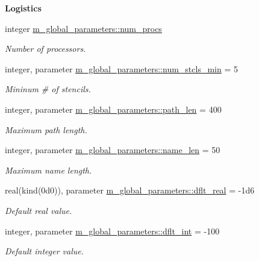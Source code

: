 \begin{Indent}\textbf{ Logistics}\par
\begin{DoxyCompactItemize}
\item 
integer \hyperlink{namespacem__global__parameters_aafb65952c33f1c363d1040bde29734ea}{m\+\_\+global\+\_\+parameters\+::num\+\_\+procs}
\begin{DoxyCompactList}\small\item\em Number of processors. \end{DoxyCompactList}\item 
integer, parameter \hyperlink{namespacem__global__parameters_a71f091e6074e6c248fd7e03218b89218}{m\+\_\+global\+\_\+parameters\+::num\+\_\+stcls\+\_\+min} = 5
\begin{DoxyCompactList}\small\item\em Mininum \# of stencils. \end{DoxyCompactList}\item 
integer, parameter \hyperlink{namespacem__global__parameters_aa9d578c318044b2f2ec990b5fc0dfab9}{m\+\_\+global\+\_\+parameters\+::path\+\_\+len} = 400
\begin{DoxyCompactList}\small\item\em Maximum path length. \end{DoxyCompactList}\item 
integer, parameter \hyperlink{namespacem__global__parameters_ac8252b115e717c6f1c8595be6f897df7}{m\+\_\+global\+\_\+parameters\+::name\+\_\+len} = 50
\begin{DoxyCompactList}\small\item\em Maximum name length. \end{DoxyCompactList}\item 
real(kind(0d0)), parameter \hyperlink{namespacem__global__parameters_a99ba7e33a1870ac89386d376e0d20526}{m\+\_\+global\+\_\+parameters\+::dflt\+\_\+real} = -\/1d6
\begin{DoxyCompactList}\small\item\em Default real value. \end{DoxyCompactList}\item 
integer, parameter \hyperlink{namespacem__global__parameters_a4e4e3806190a62a77cf6542f6d07dbbd}{m\+\_\+global\+\_\+parameters\+::dflt\+\_\+int} = -\/100
\begin{DoxyCompactList}\small\item\em Default integer value. \end{DoxyCompactList}\item 

\end{DoxyCompactItemize}
\end{Indent}
